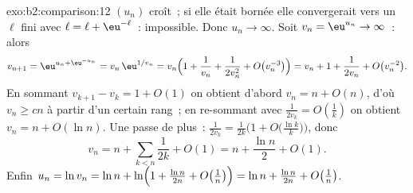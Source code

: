 \begin{solution}{exo:b2:comparison:12}
$(u_n)$ croît~; si elle était bornée elle convergerait vers un
$\ell$ fini avec $\ell = \ell + \eu^{-\ell}$~: impossible. Donc
$u_n \to \infty$. Soit $v_n = \eu^{u_n} \to \infty$~: alors
\[
v_{n+1} = \eu^{u_n + \eu^{-u_n}} = v_n\,\eu^{1/v_n}
= v_n\Bigl(1 + \frac1{v_n} + \frac1{2v_n^2} +
O\bigl(v_n^{-3}\bigr)\Bigr)
= v_n + 1 + \frac{1}{2v_n} + O\bigl(v_n^{-2}\bigr).
\]
En sommant $v_{k+1} - v_k = 1 + O(1)$ on obtient d'abord $v_n = n +
O(n)$, d'où $v_n \geq cn$ à partir d'un certain rang~; en re-sommant
avec $\frac1{2v_k} = O(\frac1k)$ on obtient $v_n = n + O(\ln n)$. Une
passe de plus~: $\frac{1}{2v_k} = \frac{1}{2k}\bigl(1 +
O\bigl(\tfrac{\ln k}k\bigr)\bigr)$, donc
\[
v_n = n + \sum_{k<n}\frac1{2k} + O(1) = n + \frac{\ln n}2 +
O(1).
\]
Enfin $u_n = \ln v_n = \ln n + \ln\Bigl(1 + \frac{\ln n}{2n} +
O\bigl(\tfrac1n\bigr)\Bigr) = \ln n + \frac{\ln n}{2n} +
O\bigl(\tfrac1n\bigr)$.
\end{solution}

